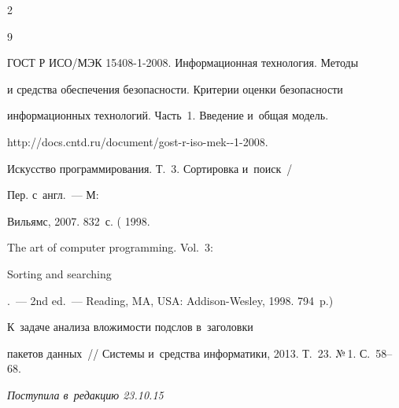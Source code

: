 \begin{multicols}{2}
{{\begin{thebibliography}{9}


ГОСТ Р ИСО/МЭК 15408-1-2008. Информационная технология. Методы 


и средства обеспечения без\-опас\-ности. Критерии оценки безопасности 


информационных технологий. Часть~1. Введение и~\mbox{общая} модель. 


{\sf http://docs.cntd.ru/document/gost-r-iso-mek--1-2008}.




 Искусство программирования. Т.~3. Сортировка и~поиск~/


Пер. с~англ.~--- М: 


Вильямс, 2007. 832~с. ( 1998. 


{The art of computer programming. Vol.~3: 


  Sorting and searching}.~--- 2nd ed.~--- Reading, MA, USA: Addison-Wesley, 1998. 794~p.)




 К~задаче анализа вложимости подслов в~заголовки 


пакетов данных~// Системы и~средства информатики, 2013. Т.~23. №\,1. С.~58--68.


 \end{thebibliography}





 }


 }





\end{multicols}





\vspace*{-6pt}





\hfill{\small\textit{Поступила в~редакцию 23.10.15}}





\vspace*{8pt}
















